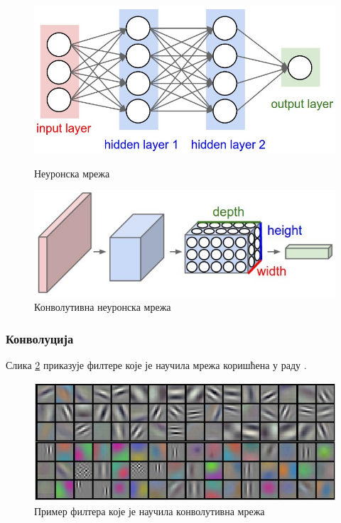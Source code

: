 \documentclass[a4paper]{article}
\begin{document}
\begin{figure}[!tbp]
	\centering
	\begin{minipage}[b]{0.45\textwidth}
		\includegraphics[width=\textwidth]{resources/neural_net}
		\caption{Неуронска мрежа}
		\label{fig:nn}
	\end{minipage}
	\hfill
	\begin{minipage}[b]{0.45\textwidth}
		\includegraphics[width=\textwidth]{resources/cnn}
		\caption{Конволутивна неуронска мрежа}
		\label{fig:cnn}
	\end{minipage}
\end{figure}

\subsubsection{Конволуција}

Слика \ref{fig:filters} приказује филтере које је научила мрежа коришћена у раду \cite{NIPS2012_4824}.

\begin{figure}[h!]
\begin{center}
    \includegraphics[width=\textwidth]{./resources/filters}
\end{center}
\caption{Пример филтера које је научила конволутивна мрежа}
\label{fig:filters}
\end{figure}
\end{document}
